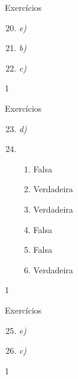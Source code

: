 \begin{answer}{Exercícios}
{\exerciselist
\begin{enumerate}\setcounter{enumi}{19}
\item \textit{e)}

\item \textit{b)}

\item \textit{c)}
\end{enumerate}
}{1}
\end{answer}
\clearmargin

\begin{answer}{Exercícios}
{\exerciselist
\begin{enumerate}\setcounter{enumi}{22}
\item \textit{d)}

\item
\begin{enumerate}
\item {} 
Falsa

\item {} 
Verdadeira

\item {} 
Verdadeira

\item {} 
Falsa

\item {} 
Falsa

\item {} 
Verdadeira

\end{enumerate}
\end{enumerate}
}{1}
\end{answer}
\clearmargin

\begin{answer}{Exercícios}
{\exerciselist
\begin{enumerate}\setcounter{enumi}{24}
\item \textit{e)}

\item \textit{c)}
\end{enumerate}
}{1}
\end{answer}
\clearmargin





